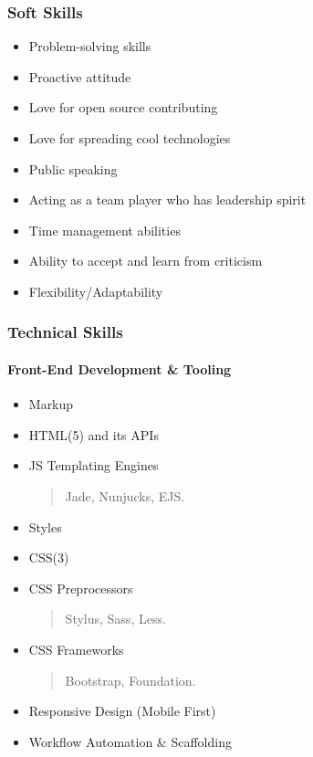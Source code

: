 \documentclass[]{article}
\providecommand{\tightlist}{%
  \setlength{\itemsep}{0pt}\setlength{\parskip}{0pt}}
\let\oldparagraph\paragraph
\renewcommand{\paragraph}[1]{\oldparagraph{#1}\mbox{}}
\begin{document}
\subsubsection{Soft Skills}\label{soft-skills}

\begin{itemize}
\tightlist
\item
  Problem-solving skills
\item
  Proactive attitude
\item
  Love for open source contributing
\item
  Love for spreading cool technologies
\item
  Public speaking
\item
  Acting as a team player who has leadership spirit
\item
  Time management abilities
\item
  Ability to accept and learn from criticism
\item
  Flexibility/Adaptability
\end{itemize}

\subsubsection{Technical Skills}\label{technical-skills}

\paragraph{Front-End Development \&
Tooling}\label{front-end-development-tooling}

\begin{itemize}
\item
  Markup
\item
  HTML(5) and its APIs
\item
  JS Templating Engines

  \begin{quote}
  Jade, Nunjucks, EJS.
  \end{quote}
\item
  Styles
\item
  CSS(3)
\item
  CSS Preprocessors

  \begin{quote}
  Stylus, Sass, Less.
  \end{quote}
\item
  CSS Frameworks

  \begin{quote}
  Bootstrap, Foundation.
  \end{quote}
\item
  Responsive Design (Mobile First)
\item
  Workflow Automation \& Scaffolding
\end{itemize}
\end{document}

